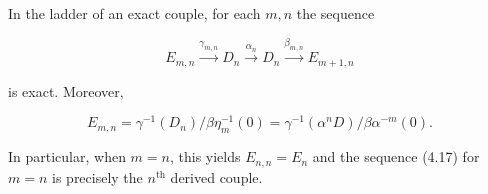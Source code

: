 In the ladder of an exact couple, for each $m, n$ the sequence

$$E_{m,n} \xrightarrow{\gamma_{m,n}} D_n \xrightarrow{\alpha_n} D_n \xrightarrow{\beta_{m,n}} E_{m+1,n}$$

is exact. Moreover,

$$E_{m,n} = \gamma^{-1}(D_n) / \beta\eta_m^{-1}(0) = \gamma^{-1}(\alpha^n D) / \beta\alpha^{-m}(0).$$

In particular, when $m = n$, this yields $E_{n,n} = E_n$ and the sequence (4.17) for $m=n$ is precisely the $n^{\text{th}}$ derived couple.
